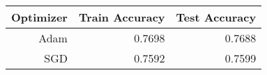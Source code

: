 \begin{tabular}{|r||r|r|}
\hline
Optimizer & Train Accuracy & Test Accuracy \\
\hline
Adam & 0.7698 & 0.7688 \\
SGD & 0.7592 & 0.7599 \\
\hline
\end{tabular}
